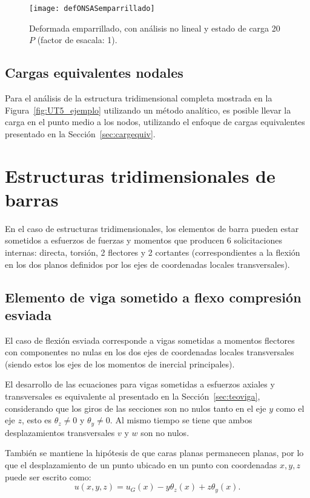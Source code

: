 \begin{figure}[htb]
	\centering
	\texttt{[image: defONSASemparrillado]}
	\caption{Deformada emparrillado, con análisis no lineal y estado de carga 20 $P$ (factor de esacala: 1).}
	\label{fig:empa}
\end{figure}


\subsection{Cargas equivalentes nodales}

Para el análisis de la estructura tridimensional completa mostrada en la Figura~\ref{fig:UT5_ejemplo} utilizando un método analítico, es posible llevar la carga en el punto medio a los nodos, utilizando el enfoque de cargas equivalentes presentado en la Sección~\ref{sec:cargequiv}.


\section{Estructuras tridimensionales de barras}

En el caso de estructuras tridimensionales, los elementos de barra pueden estar sometidos a esfuerzos de fuerzas y momentos que producen 6 solicitaciones internas: directa, torsión, 2 flectores y 2 cortantes (correspondientes a la flexión en los dos planos definidos por los ejes de coordenadas locales transversales).

\subsection{Elemento de viga sometido a flexo compresión esviada}

El caso de flexión esviada corresponde a vigas sometidas a momentos flectores con componentes no nulas en los dos ejes de coordenadas locales transversales (siendo estos los ejes de los momentos de inercial principales). %

El desarrollo de las ecuaciones para vigas sometidas a esfuerzos axiales y transversales es equivalente al presentado en la Sección~\ref{sec:teoviga}, considerando que los giros de las secciones son no nulos tanto en el eje $y$ como el eje $z$, esto es $\theta_z \neq 0$ y $\theta_y \neq 0$. %
%
Al mismo tiempo se tiene que ambos desplazamientos transversales $v$ y $w$ son no nulos.

También se mantiene la hipótesis de que caras planas permanecen planas, por lo que el desplazamiento de un punto ubicado en un punto con coordenadas $x,y,z$ puede ser escrito como:
%
\begin{equation} \label{eqn:despaxidosdir}
  u(x,y,z) = u_G(x) - y \theta_z(x) + z \theta_y(x).
\end{equation}

